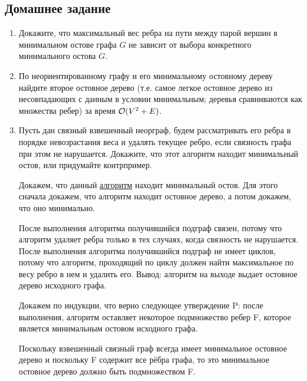 \subsection{Домашнее задание}
\begin{enumerate}
  \item
    Докажите, что максимальный вес ребра на пути между парой вершин в минимальном остове графа $G$
    не зависит от выбора конкретного минимального остова $G$.
    
  \item 
    По неориентированному графу и его минимальному остовному дереву найдите второе остовное
    дерево (т.е. самое легкое остовное дерево из несовпадающих с данным в условии минимальным;
    деревья сравниваются как множества ребер) за время $\mathcal{O}(V^2 + E)$.

  \item
    Пусть дан связный взвешенный неорграф, будем рассматривать его ребра в порядке невозрастания веса и
    удалять текущее ребро, если связность графа при этом не нарушается. Докажите, что этот алгоритм
    находит минимальный остов, или придумайте контрпример.

    \begin{solution}
      Докажем, что данный \href{https://ru.wikipedia.org/wiki/%D0%90%D0%BB%D0%B3%D0%BE%D1%80%D0%B8%D1%82%D0%BC_%D0%BE%D0%B1%D1%80%D0%B0%D1%82%D0%BD%D0%BE%D0%B3%D0%BE_%D1%83%D0%B4%D0%B0%D0%BB%D0%B5%D0%BD%D0%B8%D1%8F}{алгоритм} находит минимальный остов. Для этого сначала докажем, что алгоритм находит остовное дерево, а потом докажем, что оно минимально.

      После выполнения алгоритма получившийся подграф связен, потому что алгоритм удаляет ребра только в тех случаях, когда связность не нарушается. После выполнения алгоритма получившийся подграф не имеет циклов, потому что алгоритм, проходящий по циклу должен найти максимальное по весу ребро в нем и удалить его. Вывод: алгоритм на выходе выдает остовное дерево исходного графа.

      Докажем по индукции, что верно следующее утверждение P: после выполнения, алгоритм оставляет некоторое подмножество ребер F, которое является минимальным остовом исходного графа.
      
      Поскольку взвешенный связный граф всегда имеет минимальное остовное дерево и поскольку F содержит все рёбра графа, то это минимальное остовное дерево должно быть подмножеством F.
      

\end{solution}
\end{enumerate}
